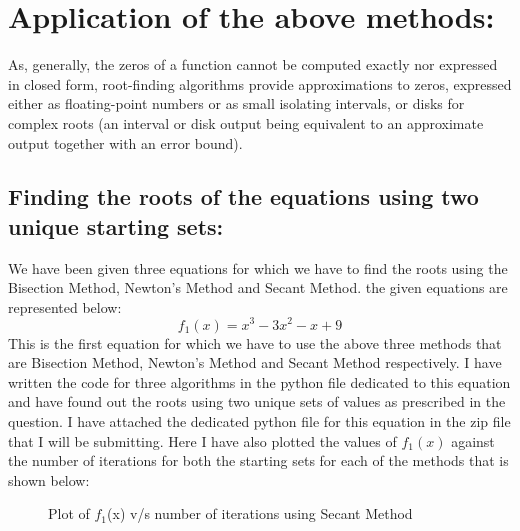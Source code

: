 \documentclass[12pt,a4paper]{article}
\begin{document}
\section{Application of the above methods:}
As, generally, the zeros of a function cannot be computed exactly nor expressed in closed form, root-finding algorithms provide approximations to zeros, expressed either as floating-point numbers or as small isolating intervals, or disks for complex roots (an interval or disk output being equivalent to an approximate output together with an error bound).
\subsection{Finding the roots of the equations using two unique starting sets:}
We have been given three equations for which we have to find the roots using the Bisection Method, Newton's Method and Secant Method. the given equations are represented below:
\begin{equation}
	\text{$f_1$}(x) = \text{$x^3$} - \text{$3x^2$} - \text{$x$} + 9
\end{equation}
This is the first equation for which we have to use the above three methods that are Bisection Method, Newton's Method and Secant Method respectively. I have written the code for  three algorithms in the python file dedicated to this equation  and have found out the roots using two unique sets of values as prescribed in the question. I have attached the dedicated python file for this equation in the zip file that I will be submitting. Here I have also plotted the values of $\text{$f_1$}(x)$ against the number of iterations for both the starting sets for each of the methods that is shown below:
\clearpage
\begin{figure}[!ht]
	\begin{center}
	\end{center}
	\caption{Plot of $f_1$(x) v/s number of iterations using Secant Method}
\end{figure}
\end{document}
